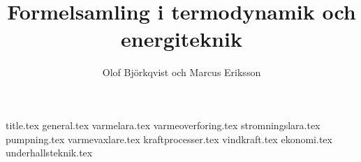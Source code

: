 \documentclass[a4paper,11pt,onecolumn,fleqn]{report}
\author{Olof Björkqvist och Marcus Eriksson}
\title{Formelsamling i termodynamik och energiteknik}
\begin{document}
{title.tex}
\tableofcontents
\setlength\LTleft{0 cm}
{general.tex}
{varmelara.tex}
{varmeoverforing.tex}
{stromningslara.tex}
{pumpning.tex}
{varmevaxlare.tex}
{kraftprocesser.tex}
{vindkraft.tex}
{ekonomi.tex}
{underhallsteknik.tex}
\cleardoublepage
\printglossary[title=Symboler, toctitle=Symboler, type=\acronymtype]
\cleardoublepage
{}
\printbibliography
\end{document}
